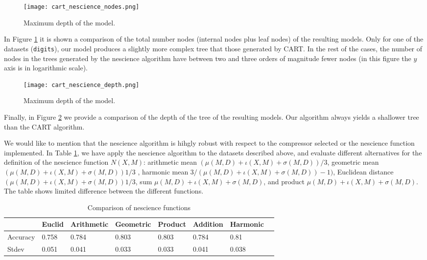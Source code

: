 \begin{figure}[h]
\centering
\texttt{[image: cart\_nescience\_nodes.png]}
\caption{Maximum depth of the model.}
\label{figure:cart_nescience_nodes}
\end{figure}

In Figure \ref{figure:cart_nescience_nodes} it is shown a comparison of the total number nodes (internal nodes plus leaf nodes) of the resulting models. Only for one of the datasets (\texttt{digits}), our model produces a slightly more complex tree that those generated by CART. In the rest of the cases, the number of nodes in the trees generated by the nescience algorithm have between two and three orders of magnitude fewer nodes (in this figure the $y$ axis is in logarithmic scale).

\begin{figure}[h]
\centering
\texttt{[image: cart\_nescience\_depth.png]}
\caption{Maximum depth of the model.}
\label{figure:cart_nescience_depth}
\end{figure}

Finally, in Figure \ref{figure:cart_nescience_depth} we provide a comparison of the depth of the tree of the resulting models. Our algorithm always yields a shallower tree than the CART algorithm.

We would like to mention that the nescience algorithm is hihgly robust with respect to the compressor selected or the nescience function implemented. In Table \ref{table:nescience_functions}, we have apply the nescience algorithm to the datasets described above, and evaluate different alternatives for the definition of the nescience function $N (X , M )$: arithmetic mean $(\mu(M , D) + \iota(X , M ) + \sigma(M, D))/3$, geometric mean $(\mu(M , D) + \iota(X , M ) + \sigma(M, D)) 1/3$ , harmonic mean $3 / (\mu(M , D) + \iota(X , M ) + \sigma(M, D)) -1 )$, Euclidean distance $(\mu(M , D) + \iota(X , M ) + \sigma(M, D)) 1/3$, sum $\mu(M , D) + \iota(X , M ) + \sigma(M, D)$, and product $\mu(M , D) + \iota(X , M ) + \sigma(M, D)$. The table shows limited difference between the different functions. 

\begin{table}[h]
\label{table:nescience_functions}
\centering
\begin{tabular}{l l l l l l l l}
\toprule
 & \textbf{Euclid} & \textbf{Arithmetic} & \textbf{Geometric} & \textbf{Product} & \textbf{Addition} & \textbf{Harmonic} \\
\midrule
Accuracy & 0.758 & 0.784 & 0.803 & 0.803 & 0.784 & 0.81 \\
Stdev & 0.051 & 0.041 & 0.033 & 0.033 & 0.041 & 0.038 \\
\bottomrule
\end{tabular}
\caption{Comparison of nescience functions}
\end{table}

